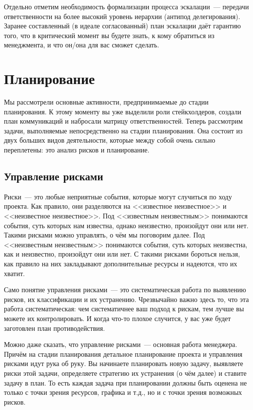 \documentclass{../../text-style}
\begin{document}
Отдельно отметим необходимость формализации процесса эскалации~--- передачи ответственности на более высокий уровень иерархии (антипод делегирования). Заранее составленный (в идеале согласованный) план эскалации даёт гарантию того, что в критический момент вы будете знать, к кому обратиться из менеджмента, и что он/она для вас сможет сделать.

\section{Планирование}

Мы рассмотрели основные активности, предпринимаемые до стадии планирования. К этому моменту вы уже выделили роли стейкхолдеров, создали план коммуникаций и набросали матрицу ответственностей. Теперь рассмотрим задачи, выполняемые непосредственно на стадии планирования. Она состоит из двух больших видов деятельности, которые между собой очень сильно переплетены: это анализ рисков и планирование. 

\subsection{Управление рисками}

Риски~--- это любые неприятные события, которые могут случиться по ходу проекта. Как правило, они разделяются на <<известное неизвестное>> и <<неизвестное неизвестное>>. Под <<известным неизвестным>> понимаются события, суть которых нам известна, однако неизвестно, произойдут они или нет. Такими рисками можно управлять, о чём мы поговорим далее. Под <<неизвестным неизвестным>> понимаются события, суть которых неизвестна, как и неизвестно, произойдут они или нет. С такими рисками бороться нельзя, как правило на них закладывают дополнительные ресурсы и надеются, что их хватит.

Само понятие управления рисками~--- это систематическая работа по выявлению рисков, их классификации и их устранению. Чрезвычайно важно здесь то, что эта работа систематическая: чем систематичнее ваш подход к рискам, тем лучше вы можете их контролировать. И когда что-то плохое случится, у вас уже будет заготовлен план противодействия.

Можно даже сказать, что управление рисками~--- основная работа менеджера. Причём на стадии планирования детальное планирование проекта и управления рисками идут рука об руку. Вы начинаете планировать новую задачу, выявляете риски этой задачи, определяете стратегию их устранения (о чём далее) и ставите задачу в план. То есть каждая задача при планировании должны быть оценена не только с точки зрения ресурсов, графика и т.д., но и с точки зрения возможных рисков.
\end{document}
